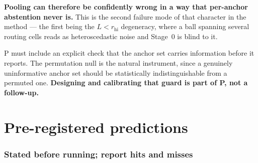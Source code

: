 \documentclass[11pt]{article}
\begin{document}
\noindent \textbf{Pooling can therefore be confidently wrong in a way that per-anchor abstention
never is.} This is the second failure mode of that character in the method --- the first being
the $L < r_{\text{hi}}$ degeneracy, where a ball spanning several routing cells reads as
heteroscedastic noise and Stage~0 is blind to it.

P must include an explicit check that the anchor set carries information before it reports. The
permutation null is the natural instrument, since a genuinely uninformative anchor set should be
statistically indistinguishable from a permuted one. \textbf{Designing and calibrating that
guard is part of P, not a follow-up.}

\part{Pre-registered predictions}

\section{Stated before running; report hits and misses}
\end{document}
